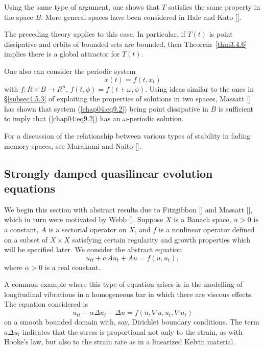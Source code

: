 \documentclass{surv-l}
\theoremstyle{plain}
\theoremstyle{definition}
\numberwithin{equation}{section}
\numberwithin{figure}{chapter}
\begin{document}
Using the same type of argument, one shows that $T$ satisfies the same property in the space $B$. More general spaces have been considered in Hale and Kato [\citeyear{1978hk}].

The preceding theory applies to this case. In particular, if $T(t)$ is point dissipative and orbits of bounded sets are bounded, then Theorem~\ref{thm3.4.6} implies there is a global attractor for $T(t)$.

One also can consider the periodic system
\begin{equation}\label{chap04:eq9.2}
\dot{x}(t)=f(t, x_{t})
\end{equation}
with $f\!:R\times B\rightarrow R^{n},\,f(t, \phi)=f(t+\omega, \phi)$. Using ideas similar to the ones in \S\ref{subsec4.5.3} of exploiting the properties of solutions in two spaces, Massatt [\citeyear{1981massatt}] has shown that system (\ref{chap04:eq9.2}) being point dissipative in $B$ is sufficient to imply that (\ref{chap04:eq9.2}) has an $\omega$-periodic solution.

For a discussion of the relationship between various types of stability in fading memory spaces, see Murakami and Naito [\citeyear{1987mn}].

\subsection[Strongly damped quasilinear evolutionary equations]{Strongly damped quasilinear evolution equations}\label{subsec4.9.2}  We begin this section with abstract results due to Fitzgibbon [\citeyear{1981f}] and Massatt [\citeyear{1983m}], which in turn
were motivated by Webb [\citeyear{1980w}]. Suppose $X$ is a Banach space, $\alpha>0$ is a constant, $A$ is a sectorial operator on $X$, and $f$ is a nonlinear operator defined on a subset of $X\times X$ satisfying certain regularity and growth properties which will be specified later. We consider the abstract equation
\begin{equation}\label{chap04:eq9.3}
u_{tt}+\alpha Au_{t}+Au=f(u, u_{t}),
\end{equation}
where $\alpha>0$ is a real constant.

A common example where this type of equation arises is in the modelling of longitudinal vibrations in a homogeneous bar in which there are viscous effects. The equation considered is
\begin{equation}\label{chap04:eq9.4}
u_{tt}-\alpha\Delta u_{t}-\Delta u=f(u, \nabla u, u_{t}, \nabla u_{t})
\end{equation}
on a smooth bounded domain with, say, Dirichlet boundary conditions. The term $a\Delta u_{t}$ indicates that the stress is proportional not only to the strain, as with Hooke's law, but also to the strain rate as in a linearized Kelvin material.
\end{document}
